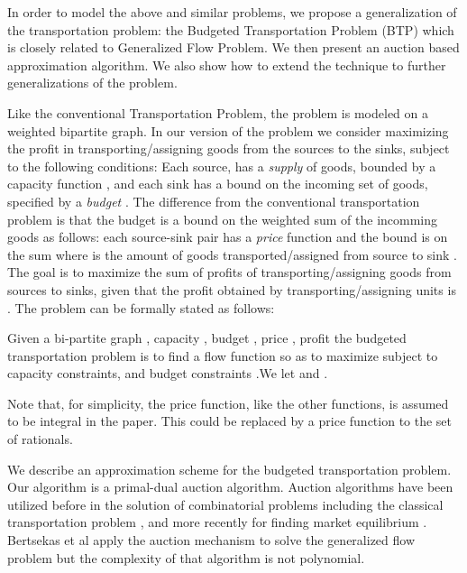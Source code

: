\documentclass[11pt]{article}
\begin{document}
In order to model the above and similar problems, we propose a generalization of the 
transportation problem: the Budgeted  Transportation Problem (BTP) which is closely related 
to Generalized Flow Problem. We then present an auction based approximation algorithm. 
We also show how to extend the technique to further generalizations of the problem. 

Like the conventional Transportation Problem, the problem is 
modeled  on a weighted bipartite graph. 
In our version of the problem we consider maximizing the profit in 
transporting/assigning goods
from the sources to the sinks, subject to the following conditions:
Each source,   has a {\it supply} of goods, bounded by a capacity function ,
and each  sink  has a bound on the incoming set of goods, 
specified by a  {\it budget} .
The difference from the conventional transportation problem is that the  budget is a 
bound on the weighted sum of the incomming goods as follows: each  source-sink 
pair  has a {\it price} function  and the bound  is on the 
sum  where  is the amount of goods transported/assigned 
from source  to sink  . 
The goal is to maximize the sum of profits of transporting/assigning goods 
from sources to sinks,
given that the profit obtained by 
transporting/assigning  units is .
The problem can be formally stated as follows: 

Given a bi-partite graph , capacity , 
budget ,
price , profit  the budgeted transportation
problem is to find a flow function 
so as to maximize  subject to capacity constraints, 
and budget constraints .We let  and .

Note that, for simplicity, the price function, like the other functions,
is assumed to be integral in the 
paper. This could be replaced by a  price function to the set of rationals.





We describe an approximation scheme for the budgeted transportation problem.
Our algorithm is a primal-dual auction algorithm.
Auction algorithms have been utilized before in the solution of combinatorial
problems \cite{bertsekastutorial,goldberg87solving} including the classical transportation 
problem \cite{bertsekas89transport}, and more recently for finding market 
equilibrium \cite{garg04auction, garg04auctionbased}. 
Bertsekas et al \cite{bertsekas97anerelaxation} apply the auction mechanism  to 
solve the generalized flow problem but the complexity of that 
algorithm is not polynomial.
\end{document}

